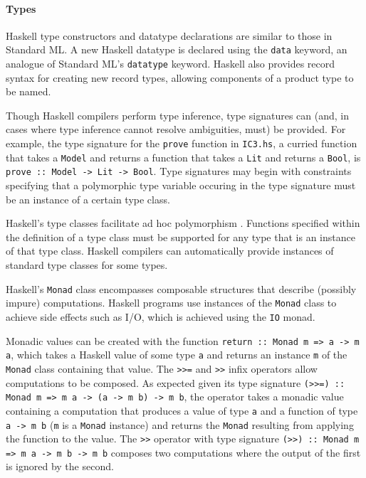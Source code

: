 \documentclass[12pt,a4paper,twoside,openright]{report}
\begin{document}
\paragraph{Types}{
Haskell type constructors and datatype declarations are similar to those in
Standard ML. A new Haskell datatype is declared using the \verb,data, keyword, an analogue
of Standard ML's \verb,datatype, keyword.
Haskell also provides record syntax for creating new record types, allowing components
of a product type to be named.

Though Haskell compilers perform type inference, type
signatures can (and, in cases where type inference cannot resolve
ambiguities, must) be provided. For example, the type signature for
the \verb,prove, function in \verb,IC3.hs,, a curried function that takes
a \verb,Model, and returns a function that takes a \verb,Lit, and returns a \verb,Bool,,
is \verb,prove :: Model -> Lit -> Bool,. Type signatures may begin with
constraints specifying that a polymorphic type variable occuring in the type
signature must be an instance of a certain type class.


Haskell's type classes facilitate ad hoc polymorphism \cite{hall94}.
Functions specified within the definition of a type class
must be supported for any type that is an instance of that type class.
Haskell compilers can automatically provide instances of standard
type classes for some types.

Haskell's \verb,Monad, class encompasses composable
structures that describe (possibly impure) computations.
Haskell programs use instances of the
\verb,Monad, class to achieve side effects such as I/O, which is
achieved using the \verb,IO, monad.

Monadic values can be created with the function
\verb,return :: Monad m => a -> m a,, which takes a Haskell
value of some type \verb,a, and returns an instance \verb,m, of the
\verb,Monad, class containing that value.
The \verb,>>=, and \verb,>>, infix operators allow computations to be composed.
As expected given its type signature
\verb,(>>=) :: Monad m => m a -> (a -> m b) -> m b,, the operator
takes a monadic value containing a computation that produces a value of type
\verb,a, and a function of type \verb,a -> m b, (\verb,m, is a \verb,Monad, instance)
and returns the \verb,Monad, resulting from applying the function to the value.
The \verb,>>, operator with type signature
\verb,(>>) :: Monad m => m a -> m b -> m b, composes two computations where
the output of the first is ignored by the second.

}
\end{document}
